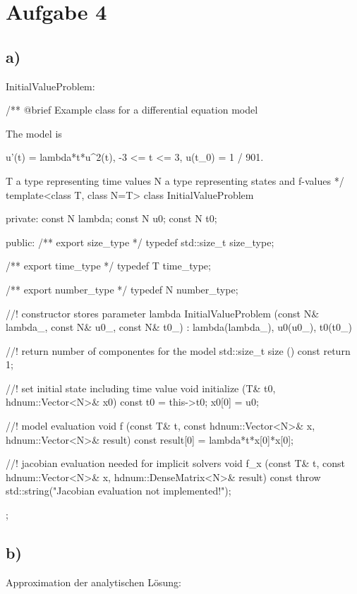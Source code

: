 \documentclass[10pt,oneside,a4paper]{scrartcl}
\begin{document}
    \newpage
    
    \section*{Aufgabe 4}
    \subsection*{a)}
    
    InitialValueProblem:

    \begin{cppcode}
/** @brief Example class for a differential equation model

    The model is

    u'(t) = lambda*t*u^2(t), -3 <= t <= 3, u(t_0) = 1 / 901.

    \tparam T a type representing time values
    \tparam N a type representing states and f-values
*/
template<class T, class N=T>
class InitialValueProblem {
private:
    const N lambda;
    const N u0;
    const N t0;

public:
    /** \brief export size_type */
    typedef std::size_t size_type;

    /** \brief export time_type */
    typedef T time_type;

    /** \brief export number_type */
    typedef N number_type;

    //! constructor stores parameter lambda
    InitialValueProblem (const N& lambda_, const N& u0_, const N& t0_)
        : lambda(lambda_), u0(u0_), t0(t0_)
    {}

    //! return number of componentes for the model
    std::size_t size () const
    {
        return 1;
    }

    //! set initial state including time value
    void initialize (T& t0, hdnum::Vector<N>& x0) const
    {
        t0 = this->t0;
        x0[0] = u0;
    }

    //! model evaluation
    void f (const T& t, const hdnum::Vector<N>& x, hdnum::Vector<N>& result) const
    {
      result[0] = lambda*t*x[0]*x[0];
    }

    //! jacobian evaluation needed for implicit solvers
    void f_x (const T& t, const hdnum::Vector<N>& x, hdnum::DenseMatrix<N>& result) const 
    {
      throw std::string("Jacobian evaluation not implemented!");
    }
};
    \end{cppcode}
    
    \newpage
    
    \subsection*{b)}
    Approximation der analytischen Lösung:
    
\end{document}
